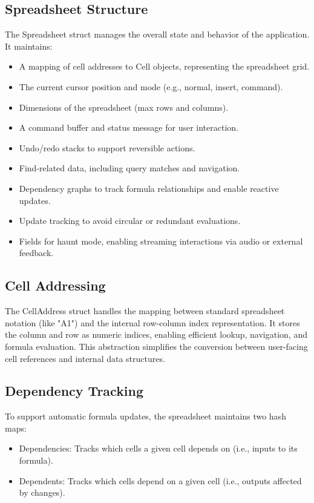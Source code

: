 \documentclass[a4paper,12pt]{article}
\begin{document}
\subsection{Spreadsheet Structure}
The Spreadsheet struct manages the overall state and behavior of the application. It maintains:
\begin{itemize}
    \item 
\vspace{-3mm}
A mapping of cell addresses to Cell objects, representing the spreadsheet grid.
\vspace{-3mm}
\item The current cursor position and mode (e.g., normal, insert, command).
\vspace{-3mm}
\item Dimensions of the spreadsheet (max rows and columns).
\vspace{-3mm}
\item A command buffer and status message for user interaction.
\vspace{-3mm}
\item Undo/redo stacks to support reversible actions.
\vspace{-3mm}
\item Find-related data, including query matches and navigation.
\vspace{-3mm}
\item Dependency graphs to track formula relationships and enable reactive updates.
\vspace{-3mm}
\item Update tracking to avoid circular or redundant evaluations.
\vspace{-3mm}
\item Fields for haunt mode, enabling streaming interactions via audio or external feedback.
\end{itemize}

\vspace{-3mm}
\subsection{Cell Addressing}
The CellAddress struct handles the mapping between standard spreadsheet notation (like "A1") and the internal row-column index representation. It stores the column and row as numeric indices, enabling efficient lookup, navigation, and formula evaluation. This abstraction simplifies the conversion between user-facing cell references and internal data structures.
\subsection{Dependency Tracking}
To support automatic formula updates, the spreadsheet maintains two hash maps:
\begin{itemize}
    \item Dependencies: Tracks which cells a given cell depends on (i.e., inputs to its formula).
    \item Dependents: Tracks which cells depend on a given cell (i.e., outputs affected by changes).
\end{itemize}
\end{document}
